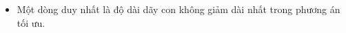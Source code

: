 \begin{itemize}
	\item     Một dòng duy nhất là độ dài dãy con không giảm dài nhất trong phương án tối ưu.   
\end{itemize}